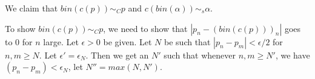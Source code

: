\newpage
















































  We claim that $bin(c(p)) \sim_C p $ and $c(bin(\alpha)) \sim_s \alpha$. 




  To show $bin(c(p)) \sim_C p$, we need to show that $|p_n - (bin(c(p)))_n|$ goes to $0$ for $n$ large. 
  Let $\epsilon>0$ be given.
  Let $N$ be such that $|p_n - p_m|< \epsilon/2$ for $n,m\geq N$. 
  Let $\epsilon' = \epsilon_N$. 
  Then we get an $N'$ such that whenever $n,m\geq N'$, we have 
  $(p_n-p_m) < \epsilon_N$, 
  let $N'' = max (N,N')$. 
  

















%
%
%
%


